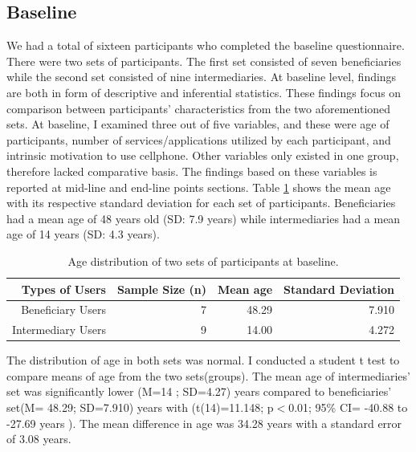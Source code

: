 \subsection{Baseline}
We had a total of sixteen participants who completed the baseline questionnaire. There were two sets of participants. The first set consisted of seven beneficiaries while the second set consisted of nine intermediaries. At baseline level, findings are both in form of descriptive and inferential statistics. These findings focus on comparison between participants' characteristics from the two aforementioned sets.  \newline
At baseline, I examined three out of five variables, and these were age of participants, number of services/applications utilized by each participant, and intrinsic motivation to use cellphone. Other variables only existed in one group, therefore lacked comparative basis. The findings based on these variables is reported at mid-line and end-line points sections. \newline
Table \ref{table:ageDist} shows the mean age with its respective standard deviation for each set of participants. Beneficiaries had a mean age of 48 years old (SD: 7.9 years) while intermediaries had a mean age of 14 years (SD: 4.3 years).
\newline
\begin{table}[h!]
  \begin{center}
    \caption{Age distribution of two sets of participants at baseline.}
    \label{table:ageDist}
	\begin{tabular}{|r|r|r|r|}
		\hline
		Types of Users& Sample Size (n)& Mean age& Standard Deviation\\
		\hline
		Beneficiary Users& 7& 48.29& 7.910\\
		\hline
		Intermediary Users& 9& 14.00& 4.272\\
		\hline
	\end{tabular}
  \end{center}
\end{table}
\newline
The distribution of age in both sets was normal. I conducted a student t test to compare means of age from the two sets(groups). The mean age of intermediaries' set was significantly lower (M=14 ; SD=4.27) years compared to beneficiaries' set(M= 48.29; SD=7.910) years with (t(14)=11.148; p$<$0.01; 95\% CI= -40.88 to -27.69 years ). The mean difference in age was 34.28 years with a standard error of 3.08 years.
\newline
